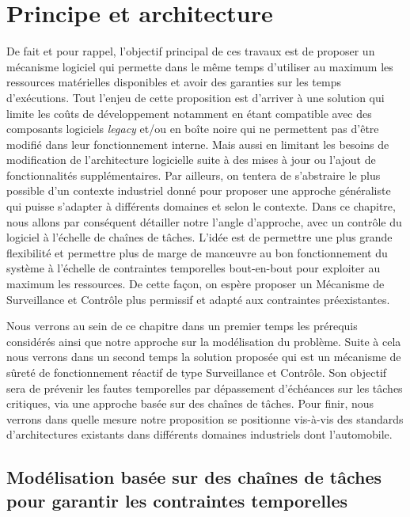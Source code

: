 \documentclass[french, a4paper, 11pt, twoside, pdftex]{StyleThese}
\begin{document}
\setcounter{chapter}{3} %
\dominitoc
\faketableofcontents
\fi

\chapter{Principe et architecture} \label{chap:3_PrincipeArchi}
\minitoc

De fait et pour rappel, l'objectif principal de ces travaux est de proposer un mécanisme logiciel qui permette dans le même temps d'utiliser au maximum les ressources matérielles disponibles et avoir des garanties sur les temps d'exécutions. Tout l'enjeu de cette proposition est d'arriver à une solution qui limite les coûts de développement notamment en étant compatible avec des composants logiciels \textit{legacy} et/ou en boîte noire qui ne permettent pas d'être modifié dans leur fonctionnement interne. Mais aussi en limitant les besoins de modification de l'architecture logicielle suite à des mises à jour ou l'ajout de fonctionnalités supplémentaires. Par ailleurs, on tentera de s'abstraire le plus possible d'un contexte industriel donné pour proposer une approche généraliste qui puisse s'adapter à différents domaines et selon le contexte.
Dans ce chapitre, nous allons par conséquent détailler notre l'angle d'approche, avec un contrôle du logiciel à l'échelle de chaînes de tâches. L'idée est de permettre une plus grande flexibilité et permettre plus de marge de manœuvre au bon fonctionnement du système à l'échelle de contraintes temporelles bout-en-bout pour exploiter au maximum les ressources. De cette façon, on espère proposer un Mécanisme de Surveillance et Contrôle plus permissif et adapté aux contraintes préexistantes.

Nous verrons au sein de ce chapitre dans un premier temps les prérequis considérés ainsi que notre approche sur la modélisation du problème. Suite à cela nous verrons dans un second temps la solution proposée qui est un mécanisme de sûreté de fonctionnement réactif de type Surveillance et Contrôle. Son objectif sera de prévenir les fautes temporelles par dépassement d'échéances sur les tâches critiques, via une approche basée sur des chaînes de tâches.
Pour finir, nous verrons dans quelle mesure notre proposition se positionne vis-à-vis des standards d'architectures existants dans différents domaines industriels dont l'automobile.



\section[Modèle basé sur des chaînes de tâches]{Modélisation basée sur des chaînes de tâches pour \mbox{garantir} les contraintes temporelles}
\end{document}
